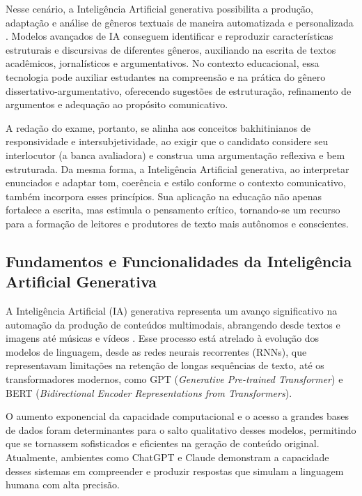 \documentclass[portuguese]{textolivre}
\begin{document}
Nesse cenário, a Inteligência Artificial generativa possibilita a produção, adaptação e análise de gêneros textuais de maneira automatizada e personalizada \cite{sachete2024adaptivegpt}. Modelos avançados de IA conseguem identificar e reproduzir características estruturais e discursivas de diferentes gêneros, auxiliando na escrita de textos acadêmicos, jornalísticos e argumentativos. No contexto educacional, essa tecnologia pode auxiliar estudantes na compreensão e na prática do gênero dissertativo-argumentativo, oferecendo sugestões de estruturação, refinamento de argumentos e adequação ao propósito comunicativo. 

A redação do exame, portanto, se alinha aos conceitos bakhitinianos de responsividade e intersubjetividade, ao exigir que o candidato considere seu interlocutor (a banca avaliadora) e construa uma argumentação reflexiva e bem estruturada. Da mesma forma, a Inteligência Artificial generativa, ao interpretar enunciados e adaptar tom, coerência e estilo conforme o contexto comunicativo, também incorpora esses princípios. Sua aplicação na educação não apenas fortalece a escrita, mas estimula o pensamento crítico, tornando-se um recurso para a formação de leitores e produtores de texto mais autônomos e conscientes.

\subsection{\textbf{Fundamentos e Funcionalidades da Inteligência Artificial Generativa}}

A Inteligência Artificial (IA) generativa representa um avanço significativo na automação da produção de conteúdos multimodais, abrangendo desde textos e imagens até músicas e vídeos \cite{loiola2024chatgpt}. Esse processo está atrelado à evolução dos modelos de linguagem, desde as redes neurais recorrentes (RNNs), que representavam limitações na retenção de longas sequências de texto, até os transformadores modernos, como GPT (\textit{Generative Pre-trained Transformer}) e BERT (\textit{Bidirectional Encoder Representations from Transformers}). 

O aumento exponencial da capacidade computacional e o acesso a grandes bases de dados foram determinantes para o salto qualitativo desses modelos, permitindo que se tornassem sofisticados e eficientes na geração de conteúdo original. Atualmente, ambientes como ChatGPT e Claude demonstram a capacidade desses sistemas em compreender e produzir respostas que simulam a linguagem humana com alta precisão.
\end{document}
